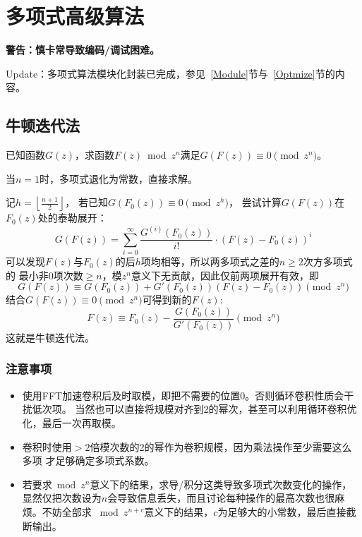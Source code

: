 \section{多项式高级算法}
{\bfseries 警告：慎卡常导致编码/调试困难。}

Update：多项式算法模块化封装已完成，参见~\ref{Module}节与~\ref{Optmize}节的内容。

\subsection{牛顿迭代法}
已知函数$G(z)$，求函数$F(z) \bmod{z^n}$满足$G(F(z))\equiv 0 \pmod{z^n}$。

当$n=1$时，多项式退化为常数，直接求解。

记$h=\left\lfloor\frac{n+1}{2}\right\rfloor$，
若已知$G(F_0(z)) \equiv 0\pmod{z^h}$，
尝试计算$G(F(z))$在$F_0(z)$处的泰勒展开：
\begin{displaymath}
    G(F(z))=\sum_{i=0}^\infty{\frac{G^{(i)}(F_0(z))}{i!}\cdot (F(z)-F_0(z))^i}
\end{displaymath}
可以发现$F(z)$与$F_0(z)$的后$h$项均相等，所以两多项式之差的$n\geq 2$次方多项式的
最小非0项次数$\geq n$，模$z^n$意义下无贡献，因此仅前两项展开有效，即
\begin{displaymath}
    G(F(z))\equiv G(F_0(z))+G'(F_0(z))(F(z)-F_0(z)) \pmod{z^n}
\end{displaymath}
结合$G(F(z))\equiv 0 \pmod{z^n}$可得到新的$F(z)$:
\begin{displaymath}
    F(z)\equiv F_0(z)-\frac{G(F_0(z))}{G'(F_0(z))} \pmod{z^n}
\end{displaymath}
这就是牛顿迭代法。

\subsubsection{注意事项}
\begin{itemize}
    \item 使用FFT加速卷积后及时取模，即把不需要的位置0。否则循环卷积性质会干扰低次项。
    当然也可以直接将规模对齐到2的幂次，甚至可以利用循环卷积优化，最后一次再取模。
    \item 卷积时使用$>2$倍模次数的2的幂作为卷积规模，因为乘法操作至少需要这么多项
    才足够确定多项式系数。
    \item 若要求$\bmod{z^n}$意义下的结果，求导/积分这类导致多项式次数变化的操作，
    显然仅把次数设为$n$会导致信息丢失，而且讨论每种操作的最高次数也很麻烦。不妨全部求
    $\bmod{z^{n+c}}$意义下的结果，$c$为足够大的小常数，最后直接截断输出。
\end{itemize}

